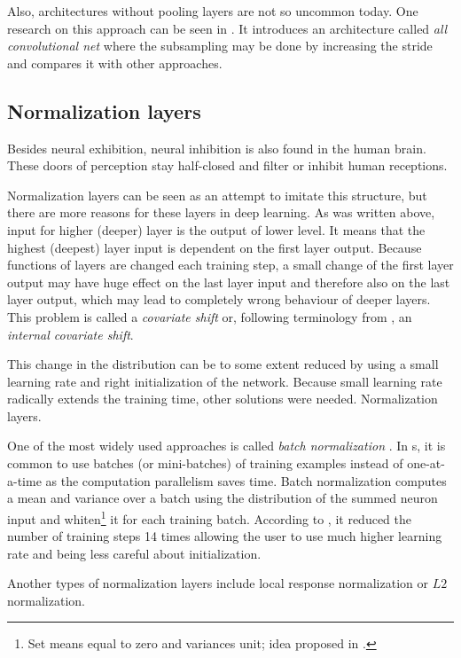 Also, architectures without pooling layers are not so uncommon today. One 
research on this approach can be seen in \cite{all-conv-net}. It introduces an 
architecture called \textit{all convolutional net} where the subsampling may be 
done by increasing the stride and compares it with other approaches. 

\subsection{Normalization layers}
\label{norm-layers}

Besides neural exhibition, neural inhibition is also found in the human brain. 
These doors of perception stay half-closed and filter or inhibit human 
receptions.

Normalization layers can be seen as an attempt to imitate this structure, but 
there are more reasons for these layers in deep learning. As was written above, 
input for higher (deeper) layer is the output of lower level. It means that the 
highest (deepest) layer input is dependent on the first layer output. Because 
functions of layers are changed each training step, a small change of the first 
layer output may have huge effect on the last layer input and therefore also on 
the last layer output, which may lead to completely wrong behaviour of deeper 
layers. This problem is called a \textit{covariate shift} or, following 
terminology from \cite{batch-norm}, an \textit{internal covariate shift}. 

This change in the distribution can be to some extent reduced by using a small 
learning rate and right initialization of the network. Because small learning 
rate radically extends the training time, other solutions were needed. 
Normalization layers. 

One of the most widely used approaches is called \textit{batch normalization} 
\cite{batch-norm}. In s, it is common to use batches (or mini-batches) 
of training examples instead of one-at-a-time as the computation parallelism 
saves time. Batch normalization computes a mean and variance over a batch using 
the distribution of the summed neuron input and whiten\footnote{Set means equal 
to zero and variances unit; idea proposed in \cite{tricks}.} it for each 
training batch. According to \cite{batch-norm}, it reduced the number of 
training steps 14 times allowing the user to use much higher learning rate and 
being less careful about initialization.

Another types of normalization layers include local response normalization or 
$L2$ normalization.

